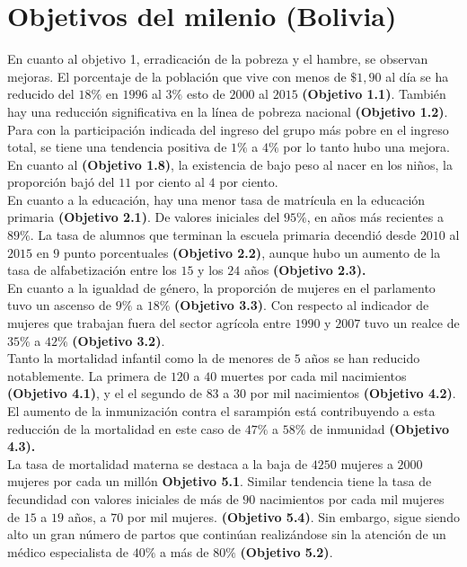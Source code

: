 \chapter{Objetivos del milenio (Bolivia)}

En cuanto al objetivo 1, erradicación de la pobreza y el hambre, se observan mejoras. El porcentaje de la población que vive con menos de $\$ 1,90$ al día se ha reducido del $18 \%$ en $1996$ al $3\%$ esto de $2000$ al $2015$ \textbf{(Objetivo 1.1)}. También hay una reducción significativa en la línea de pobreza nacional \textbf{(Objetivo 1.2)}. Para    con la participación indicada del ingreso del grupo más pobre en el ingreso total, se tiene una tendencia positiva de $1\%$ a $4\%$ por lo tanto  hubo una mejora. En cuanto al \textbf{(Objetivo 1.8)}, la existencia de bajo peso al nacer en los niños, la proporción bajó del $11$ por ciento al $4$ por ciento.\\
En cuanto a la educación, hay una menor tasa de matrícula en la educación primaria \textbf{(Objetivo 2.1)}. De valores iniciales del $95\%$, en años más recientes a $89\%$. La tasa de alumnos que terminan la escuela primaria decendió desde $2010$ al $2015$ en $9$ punto porcentuales \textbf{(Objetivo 2.2)}, aunque hubo un aumento de la tasa de alfabetización entre los $15$ y los $24$ años \textbf{(Objetivo 2.3).}\\
En cuanto a la igualdad de género, la proporción de mujeres en el parlamento tuvo un  ascenso de $9\%$ a $18\%$ \textbf{(Objetivo 3.3)}. Con respecto al indicador de mujeres que trabajan fuera del sector agrícola entre $1990$ y $2007$ tuvo un realce de $35\%$ a $42\%$ \textbf{(Objetivo 3.2)}.\\
Tanto la mortalidad infantil como la de menores de $5$ años se han reducido notablemente. La primera de $120$ a $40$ muertes por cada mil nacimientos \textbf{(Objetivo 4.1)}, y el el segundo de $83$ a $30$ por mil nacimientos \textbf{(Objetivo 4.2)}. El aumento de la inmunización contra el sarampión está contribuyendo a esta reducción de la mortalidad en este caso de $47\%$ a $58\%$ de inmunidad \textbf{(Objetivo 4.3).}\\
La tasa de mortalidad materna se destaca a la baja de $4250$ mujeres a $2000$ mujeres por cada un millón \textbf{Objetivo 5.1}. Similar tendencia tiene la tasa de fecundidad con valores iniciales de más de $90$ nacimientos por cada mil mujeres de $15$ a $19$ años, a $70$ por mil mujeres. \textbf{(Objetivo 5.4)}. Sin embargo, sigue siendo alto un gran número de partos que continúan realizándose sin la atención de un médico  especialista de $40\%$ a más de $80\%$ \textbf{(Objetivo 5.2)}.\\
